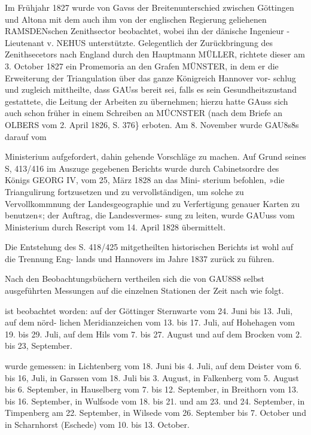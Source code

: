 \documentclass[12pt,a4paper]{article}
\theoremstyle{plain}
\theoremstyle{definition}
\theoremstyle{remark}
\begin{document}
\noindent
Im Frühjahr 1827 wurde von Gavss der Breitenunterschied zwischen Göttingen und Altona mit dem
auch ihm von der englischen Regierung geliehenen RAMSDENschen Zenithsector beobachtet, wobei ihn der
dänische Ingenieur - Lieutenant v. NEHUS unterstützte. Gelegentlich der Zurückbringung des Zenithsecetors
nach England durch den Hauptmann MÜLLER, richtete dieser am 3. October 1827 ein Promemoria an den
Grafen MÜNSTER, in dem er die Erweiterung der Triangulation über das ganze Königreich Hannover vor-
schlug und zugleich mittheilte, dass GAUss bereit sei, falls es sein Gesundheitszustand gestattete, die Leitung
der Arbeiten zu übernehmen; hierzu hatte GAuss sich auch schon früher in einem Schreiben an MÜCNSTER
(nach dem Briefe an OLBERS vom 2. April 1826, S. 376\} erboten. Am 8. November wurde GAU8s8s darauf vom

\noindent

\noindent
Ministerium aufgefordert, dahin gehende Vorschläge zu machen. Auf Grund seines S, 413/416 im Auszuge
gegebenen Berichts wurde durch Cabinetsordre des Königs GEORG IV, vom 25, März 1828 an das Mini-
sterium befohlen, »die Triangulirung fortzusetzen und zu vervollständigen, um solche zu Vervollkommnung
der Landesgeographie und zu Verfertigung genauer Karten zu benutzen«; der Auftrag, die Landesvermes-
sung zu leiten, wurde GAUuss vom Ministerium durch Rescript vom 14. April 1828 übermittelt.

\noindent
Die Entstehung des S. 418/425 mitgetheilten historischen Berichts ist wohl auf die Trennung Eng-
lands und Hannovers im Jahre 1837 zurück zu führen.

\noindent
Nach den Beobachtungsbüchern vertheilen sich die von GAU8S8 selbst ausgeführten Messungen auf die
einzelnen Stationen der Zeit nach wie folgt.

 ist beobachtet worden: auf der Göttinger Sternwarte vom 24. Juni bis 13. Juli, auf dem nörd-
lichen Meridianzeichen vom 13. bis 17. Juli, auf Hohehagen vom 19. bis 29. Juli, auf dem Hils vom 7. bis
27. August und auf dem Brocken vom 2. bis 23, September.

 wurde gemessen: in Lichtenberg vom 18. Juni bis 4. Juli, auf dem Deister vom 6. bis 16, Juli,
in Garssen vom 18. Juli bis 3. August, in Falkenberg vom 5. August bis 6. September, in Hauselberg vom
7. bis 12. September, in Breithorn vom 13. bis 16. September, in Wulfsode vom 18. bis 21. und am 23.
und 24. September, in Timpenberg am 22. September, in Wilsede vom 26. September bis 7. October und in
Scharnhorst (Eschede) vom 10. bis 13. October.
\end{document}
